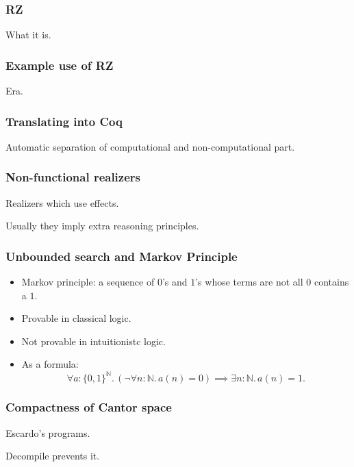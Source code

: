 \documentclass[t]{beamer}
\newcommand{\NN}{\mathbb{N}}
\begin{document}
\begin{frame}
  \frametitle{RZ}

  What it is.
\end{frame}

\begin{frame}
  \frametitle{Example use of RZ}

  Era.
\end{frame}

\begin{frame}
  \frametitle{Translating into Coq}

  Automatic separation of computational and non-computational part.
\end{frame}

\begin{frame}
  \frametitle{Non-functional realizers}

  Realizers which use effects.

  Usually they imply extra reasoning principles.
\end{frame}

\begin{frame}
  \frametitle{Unbounded search and Markov Principle}

  \begin{itemize}
  \item Markov principle: a sequence of $0$'s and $1$'s whose terms
    are not all $0$ contains a $1$.
  \item Provable in classical logic.
  \item Not provable in intuitionistc logic.
  \item As a formula:
    \begin{equation*}
      \forall a : \{0,1\}^\NN .\,
      (\lnot \forall n : \NN .\, a(n) = 0) \implies
      \exists n : \NN .\, a(n) = 1.
    \end{equation*}
  \end{itemize}
\end{frame}

\begin{frame}
  \frametitle{Compactness of Cantor space}

  Escardo's programs.

  Decompile prevents it.
\end{frame}
\end{document}
